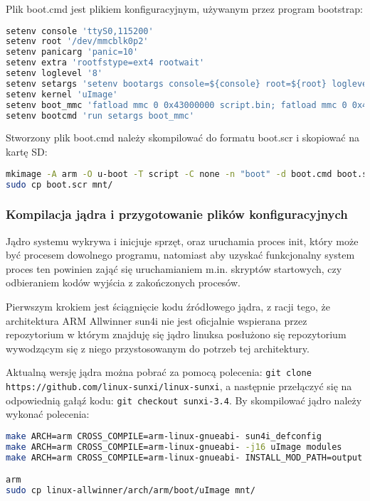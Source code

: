 \par

Plik boot.cmd jest plikiem konfiguracyjnym, używanym przez program bootstrap:

\begin{lstlisting}[language=bash]
setenv console 'ttyS0,115200'
setenv root '/dev/mmcblk0p2'
setenv panicarg 'panic=10'
setenv extra 'rootfstype=ext4 rootwait'
setenv loglevel '8'
setenv setargs 'setenv bootargs console=${console} root=${root} loglevel=${loglevel} ${panicarg} ${extra}'
setenv kernel 'uImage'
setenv boot_mmc 'fatload mmc 0 0x43000000 script.bin; fatload mmc 0 0x48000000 ${kernel}; bootm 0x48000000'
setenv bootcmd 'run setargs boot_mmc'
\end{lstlisting}

Stworzony plik boot.cmd należy skompilować do formatu boot.scr i skopiować na kartę SD:

\begin{lstlisting}[language=bash]
mkimage -A arm -O u-boot -T script -C none -n "boot" -d boot.cmd boot.scr
sudo cp boot.scr mnt/
\end{lstlisting}


\subsubsection{Kompilacja jądra i przygotowanie plików konfiguracyjnych}

Jądro systemu wykrywa i inicjuje sprzęt, oraz uruchamia proces init, który może być procesem dowolnego programu, natomiast aby uzyskać funkcjonalny system proces ten powinien zająć się uruchamianiem m.in. skryptów startowych, czy odbieraniem kodów wyjścia z zakończonych procesów.

Pierwszym krokiem jest ściągnięcie kodu źródłowego jądra, z racji tego, że architektura ARM Allwinner sun4i nie jest oficjalnie wspierana przez repozytorium w którym znajduję się jądro linuksa posłużono się repozytorium wywodzącym się z niego przystosowanym do potrzeb tej architektury.

Aktualną wersję jądra można pobrać za pomocą polecenia: \lstinline{git clone https://github.com/linux-sunxi/linux-sunxi}, a następnie przełączyć się na odpowiednią gałąź kodu: \lstinline{git checkout sunxi-3.4}. By skompilować jądro należy wykonać polecenia:

\begin{lstlisting}[language=bash]
make ARCH=arm CROSS_COMPILE=arm-linux-gnueabi- sun4i_defconfig
make ARCH=arm CROSS_COMPILE=arm-linux-gnueabi- -j16 uImage modules
make ARCH=arm CROSS_COMPILE=arm-linux-gnueabi- INSTALL_MOD_PATH=output modules_install

arm
sudo cp linux-allwinner/arch/arm/boot/uImage mnt/
\end{lstlisting}

